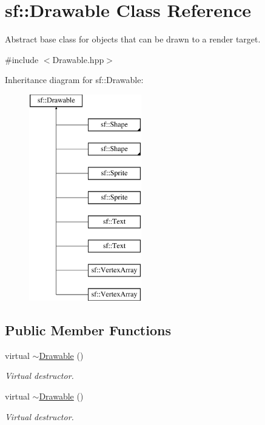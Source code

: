 \hypertarget{classsf_1_1_drawable}{\section{sf\-:\-:Drawable Class Reference}
\label{classsf_1_1_drawable}
}


Abstract base class for objects that can be drawn to a render target.  




{\ttfamily \#include $<$Drawable.\-hpp$>$}

Inheritance diagram for sf\-:\-:Drawable\-:\begin{figure}[H]
\begin{center}
\leavevmode
\includegraphics[height=9.000000cm]{classsf_1_1_drawable}
\end{center}
\end{figure}
\subsection*{Public Member Functions}
\begin{DoxyCompactItemize}
\item 
virtual \hyperlink{classsf_1_1_drawable_a906002f2df7beb5edbddf5bbef96f120}{$\sim$\-Drawable} ()
\begin{DoxyCompactList}\small\item\em Virtual destructor. \end{DoxyCompactList}\item 
virtual \hyperlink{classsf_1_1_drawable_a906002f2df7beb5edbddf5bbef96f120}{$\sim$\-Drawable} ()
\begin{DoxyCompactList}\small\item\em Virtual destructor. \end{DoxyCompactList}\end{DoxyCompactItemize}

